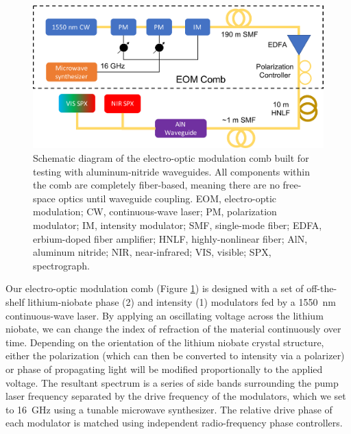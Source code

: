 \begin{figure}
    \centering
    \includegraphics[width=\textwidth]{figures-3/eom-diagram.pdf}
    \caption[Electro-optic modulation comb schematic diagram]{Schematic diagram of the electro-optic modulation comb built for testing with aluminum-nitride waveguides. All components within the comb are completely fiber-based, meaning there are no free-space optics until waveguide coupling. EOM, electro-optic modulation; CW, continuous-wave laser; PM, polarization modulator; IM, intensity modulator; SMF, single-mode fiber; EDFA, erbium-doped fiber amplifier; HNLF, highly-nonlinear fiber; AlN, aluminum nitride; NIR, near-infrared; VIS, visible; SPX, spectrograph.}
    \label{fig:eom-diagram}
\end{figure}

Our electro-optic modulation comb (Figure \ref{fig:eom-diagram}) is designed with a set of off-the-shelf lithium-niobate phase (2) and intensity (1) modulators fed by a 1550~\si{\nano\meter} continuous-wave laser. By applying an oscillating voltage across the lithium niobate, we can change the index of refraction of the material continuously over time. Depending on the orientation of the lithium niobate crystal structure, either the polarization (which can then be converted to intensity via a polarizer) or phase of propagating light will be modified proportionally to the applied voltage. The resultant spectrum is a series of side bands surrounding the pump laser frequency separated by the drive frequency of the modulators, which we set to 16~\si{\giga\hertz} using a tunable microwave synthesizer. The relative drive phase of each modulator is matched using independent radio-frequency phase controllers.

